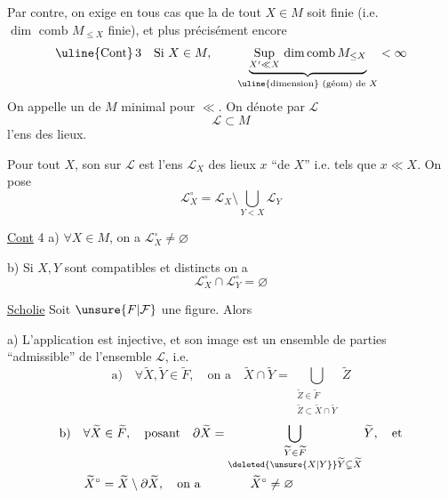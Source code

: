 Par contre, on exige en tous cas que la  de tout  $X\in M$ soit finie (i.e. $\dim\text{ comb }M_{\leq X}$ finie), et plus  précisément encore
\[
\uline{\text{Cont}}\,3 \quad \text{Si } X\in M,\qquad
\underbrace{\mathop{\mathrm{Sup}}\limits_{X'\ll X}\,\mathrm{dim\,comb}\,M_{\leq X}}_{\text{\uline{dimension} (géom) de }X}<\infty
\]
On appelle  un  de $M$ minimal pour $\ll$. On dénote par $\mathcal L$
\[
\mathcal L\subset M
\]
l'ens des lieux.

Pour tout $X$, son   sur $\mathcal L$ est l'ens $\mathcal L_{X}$ des lieux $x$  ``de $X$'' i.e. tels que $x\ll X$. On pose
\[
\mathcal L_X^{\circ}=\mathcal L_X\setminus\bigcup_{Y<X}\mathcal L_Y
\]

\uline{Cont} 4 \quad a) $\forall X\in M$, on a $\mathcal L_X^{\circ}\neq\varnothing$

b) Si $X,Y$ sont compatibles et distincts on a
\[
\mathcal L_X^{\circ}\cap \mathcal L_Y^{\circ}=\varnothing
\]

\uline{Scholie}  Soit $\unsure{F|\mathcal F}$ une figure. Alors

a) L'application
est injective, et son image  est un ensemble de parties ``admissible'' de l'ensemble $\mathcal L$, i.e.
\[
\text{a)}\quad\forall\widetilde X,\widetilde Y\in\widetilde F,\quad\text{on a}\quad
\widetilde X\cap\widetilde Y=\bigcup_{\substack{\widetilde Z\in\widetilde F\\ \widetilde Z\subset\widetilde X\cap\widetilde Y}}\widetilde Z
\]
\[
\begin{aligned}
&\text{b)}\quad \forall\widetilde X\in\widetilde F,\quad\text{posant}\quad
\partial\widetilde X=\bigcup_{\substack{\widetilde Y\in\widetilde F\\ \deleted{\unsure{X|Y}}\widetilde Y\subsetneq\widetilde X}}\widetilde Y,\quad\text{et}\\
&\qquad\widetilde X^{\circ}=\widetilde X\setminus\partial\widetilde X,\quad\text{on a}\qquad\qquad \widetilde X^\circ\neq\varnothing
\end{aligned}
\]

